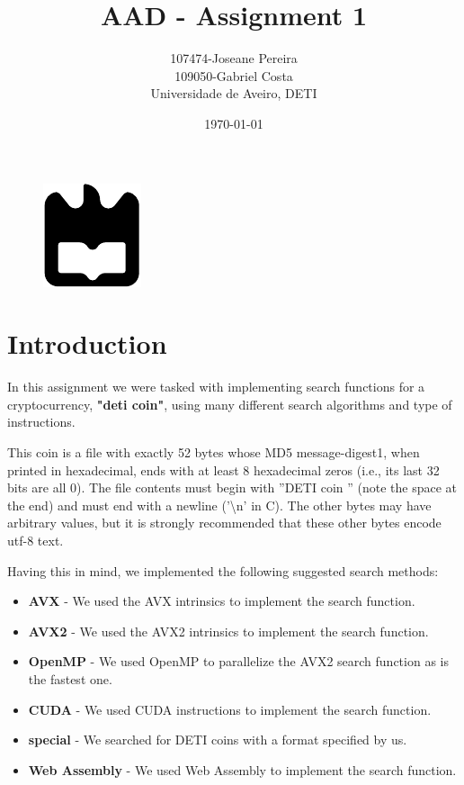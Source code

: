 \documentclass[a4paper,12pt]{article}
\title{AAD - Assignment 1}
\author{107474-Joseane Pereira \\
109050-Gabriel Costa \\
Universidade de Aveiro, DETI}
\date{\today}
\begin{document}
\begin{figure}
    \centering
    \includegraphics[width=0.3\linewidth]{ua.pdf}
    \label{fig:enter-label}
\end{figure}
\maketitle
\newpage
\tableofcontents
\newpage

\section{Introduction}
\label{sec:introduction}

In this assignment we were tasked with implementing search functions for a cryptocurrency,
\textbf{"deti coin"}, using many different search algorithms and type of instructions.

This coin is  a file with exactly 52 bytes whose MD5 message-digest1, when printed in hexadecimal,
ends with at least 8 hexadecimal zeros (i.e., its last 32 bits are all 0). The file contents must begin with
”DETI coin ” (note the space at the end) and must end with a newline (’\textbackslash n’ in C). The other bytes may
have arbitrary values, but it is strongly recommended that these other bytes encode utf-8 text. 

Having this in mind, we implemented the following suggested search methods:
\begin{itemize}
    \item \textbf{AVX} - We used the AVX intrinsics to implement the search function.
    \item \textbf{AVX2} - We used the AVX2 intrinsics to implement the search function.
    \item \textbf{OpenMP} - We used OpenMP to parallelize the AVX2 search function as is the fastest one.
    \item \textbf{CUDA} - We used CUDA instructions to implement the search function.
    \item \textbf{special} - We searched for DETI coins with a format specified by us.
    \item \textbf{Web Assembly} - We used Web Assembly to implement the search function.
\end{itemize}
\end{document}
